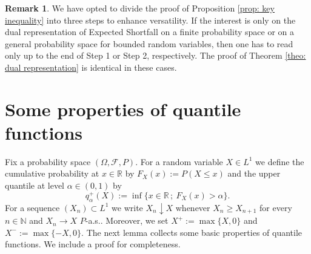 \documentclass[12pt]{article}
\theoremstyle{plain}
\theoremstyle{definition}
\newtheorem{remark}[theorem]{Remark}
\theoremstyle{remark}
\numberwithin{equation}{section}
\newcommand{\probp}{P}
\newcommand{\R}{\mathbb{R}}
\newcommand{\N}{\mathbb{N}}
\newcommand{\cF}{{\mathcal{F}}}
\begin{document}
\smallskip

\begin{remark}
We have opted to divide the proof of Proposition \ref{prop: key inequality} into three steps to enhance versatility. If the interest is only on the dual representation of Expected Shortfall on a finite probability space or on a general probability space for bounded random variables, then one has to read only up to the end of  Step 1 or Step 2, respectively. The proof of Theorem \ref{theo: dual representation} is identical in these cases.
\end{remark}


\appendix

\section{Some properties of quantile functions}

Fix a probability space $(\Omega,\cF,\probp)$. For a random variable $X\in L^1$ we define the cumulative probability at $x\in\R$ by $F_X(x):=\probp(X\le x)$ and the upper quantile at level $\alpha\in(0,1)$ by
\[
q^+_\alpha(X) := \inf\{x\in\R \,; \ F_X(x)>\alpha\}.
\]
For a sequence $(X_n)\subset L^1$ we write $X_n\downarrow X$ whenever $X_n\ge X_{n+1}$ for every $n\in\N$ and $X_n\to X$ $\probp$-a.s.. Moreover, we set $X^+:=\max\{X,0\}$ and $X^-:=\max\{-X,0\}$. The next lemma collects some basic properties of quantile functions. We include a proof for completeness.
\end{document}
